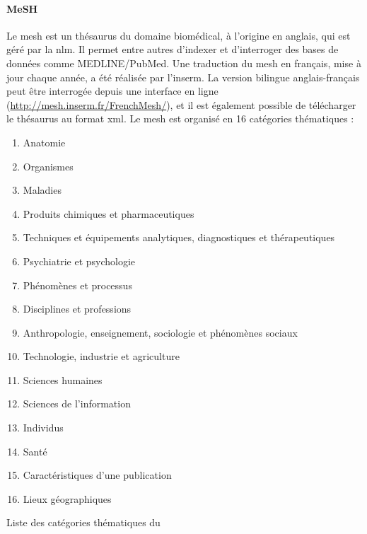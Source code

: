 \paragraph{MeSH}
Le \gls{mesh} \cite{lipscombMedicalSubjectHeadings2000} est un thésaurus du domaine biomédical, à l'origine en anglais, qui est géré par la \gls{nlm}.
Il permet entre autres d'indexer et d'interroger des bases de données comme MEDLINE/PubMed.
Une traduction du \gls{mesh} en français, mise à jour chaque année, a été réalisée par l'\gls{inserm}.
La version bilingue anglais-français peut être interrogée depuis une interface en ligne (\url{http://mesh.inserm.fr/FrenchMesh/}), et il est également possible de télécharger le thésaurus au format \acrshort{xml}.
Le \gls{mesh} est organisé en \num{16} catégories thématiques :

\begin{table}[H]
    \begin{multicols}{2}
        \begin{enumerate}[label=\textbf{\Alph*}]
            \item \label{mesh:A} Anatomie
            \item \label{mesh:B} Organismes
            \item \label{mesh:C} Maladies
            \item \label{mesh:D} Produits chimiques et pharmaceutiques
            \item \label{mesh:E} Techniques et équipements analytiques, diagnostiques et thérapeutiques
            \item \label{mesh:F} Psychiatrie et psychologie
            \item \label{mesh:G} Phénomènes et processus
            \item \label{mesh:H} Disciplines et professions
            \item \label{mesh:I} Anthropologie, enseignement, sociologie et phénomènes sociaux
            \item \label{mesh:J} Technologie, industrie et agriculture
            \item \label{mesh:K} Sciences humaines
            \item \label{mesh:L} Sciences de l'information
            \item \label{mesh:M} Individus
            \item \label{mesh:N} Santé
                  \setcounter{enumi}{21}
            \item \label{mesh:V} Caractéristiques d'une publication
                  \setcounter{enumi}{25}
            \item \label{mesh:Z} Lieux géographiques
        \end{enumerate}
    \end{multicols}
    \caption{Liste des catégories thématiques du }
\end{table}


